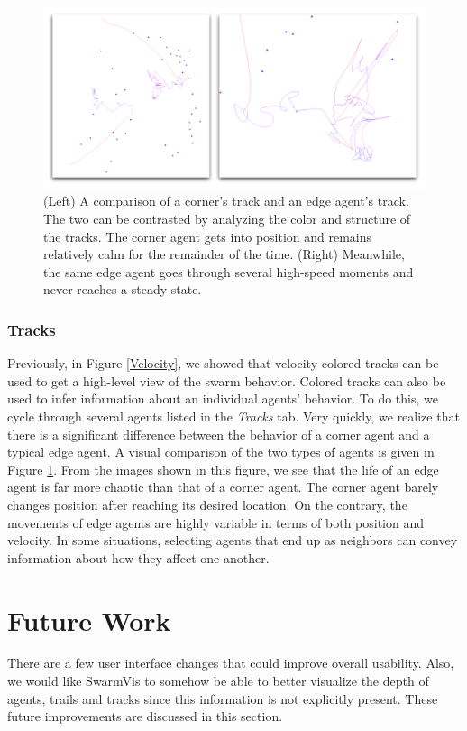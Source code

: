\documentclass[conference]{IEEEtran}
\begin{document}
\begin{figure}
\centering
\includegraphics[scale=.27]{images/cornervsedge.pdf}
\caption{
(Left) A comparison of a corner's track and an edge agent's track.
The two can be contrasted by analyzing the color and structure of the tracks.
The corner agent gets into position and remains relatively calm for the remainder of the time.
(Right) Meanwhile, the same edge agent goes through several high-speed moments and never reaches a steady state.
}
\label{CornerAndEdge}
\end{figure}

\subsubsection{Tracks}
Previously, in Figure \ref{Velocity}, we showed that velocity colored tracks can be used to get a high-level view of the swarm behavior.
Colored tracks can also be used to infer information about an individual agents' behavior.
To do this, we cycle through several agents listed in the \textit{Tracks} tab.
Very quickly, we realize that there is a significant difference between the behavior of a corner agent and a typical edge agent.
A visual comparison of the two types of agents is given in Figure \ref{CornerAndEdge}.
From the images shown in this figure, we see that the life of an edge agent is far more chaotic than that of a corner agent.
The corner agent barely changes position after reaching its desired location.
On the contrary, the movements of edge agents are highly variable in terms of both position and velocity.
In some situations, selecting agents that end up as neighbors can convey information about how they affect one another.





\section{Future Work}
There are a few user interface changes that could improve overall usability.
Also, we would like SwarmVis to somehow be able to better visualize the depth of
agents, trails and tracks since this information is not explicitly present.
These future improvements are discussed in this section.
\end{document}
